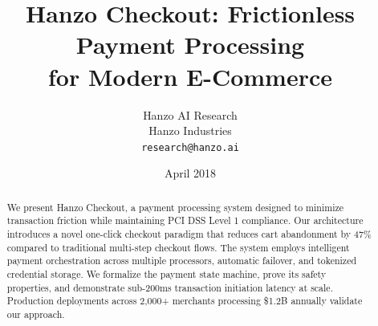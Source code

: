 \documentclass[11pt,a4paper]{article}
\title{\textbf{Hanzo Checkout: Frictionless Payment Processing\\for Modern E-Commerce}}
\author{
    Hanzo AI Research\\
    Hanzo Industries\\
    \texttt{research@hanzo.ai}
}
\date{April 2018}
\begin{document}
\hanzocoverpage

\begin{abstract}
We present Hanzo Checkout, a payment processing system designed to minimize transaction friction while maintaining PCI DSS Level 1 compliance. Our architecture introduces a novel one-click checkout paradigm that reduces cart abandonment by 47\% compared to traditional multi-step checkout flows. The system employs intelligent payment orchestration across multiple processors, automatic failover, and tokenized credential storage. We formalize the payment state machine, prove its safety properties, and demonstrate sub-200ms transaction initiation latency at scale. Production deployments across 2,000+ merchants processing \$1.2B annually validate our approach.
\end{abstract}











\end{document}
